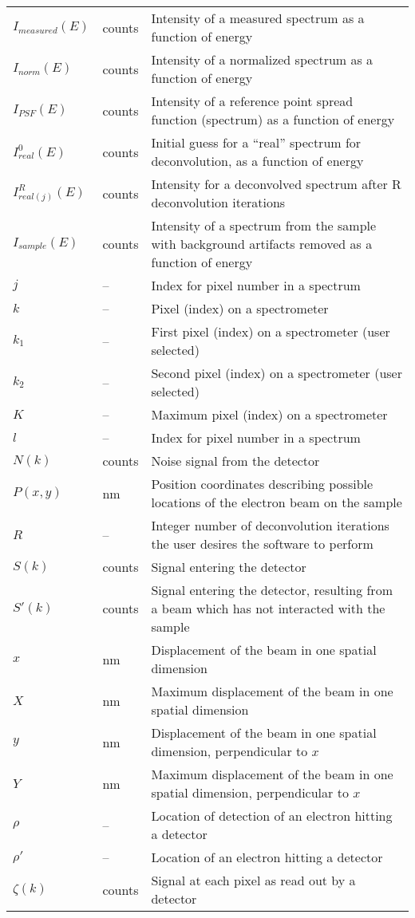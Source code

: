 \documentclass[12pt]{article}
\begin{document}
\begin{longtable*}{l l p{12cm}}
$I_{measured}(E)$ & counts & Intensity of a measured spectrum as a function of
energy\\
$I_{norm}(E)$ & counts & Intensity of a normalized spectrum as a function of
energy\\
$I_{PSF}(E)$ & counts & Intensity of a reference point spread function
(spectrum) as a function of energy\\
$I_{real}^0(E)$ & counts & Initial guess for a ``real'' spectrum for
deconvolution, as a function of energy\\
$I_{real (j)}^R(E)$ & counts & Intensity for a deconvolved spectrum after R
deconvolution iterations\\
$I_{sample}(E)$ & counts & Intensity of a spectrum from the sample with
background artifacts removed as a function of energy\\
$j$ & -- & Index for pixel number in a spectrum\\
$k$ & -- & Pixel (index) on a spectrometer\\
$k_1$ & -- & First pixel (index) on a spectrometer (user selected)\\
$k_2$ & -- & Second pixel (index) on a spectrometer (user selected)\\
$K$ & -- & Maximum pixel (index) on a spectrometer\\
$l$ & -- & Index for pixel number in a spectrum\\
$N(k)$ & counts & Noise signal from the detector\\
$P(x,y)$ & \si{\nano\metre} & Position coordinates describing possible locations
of the electron beam on the sample\\
$R$ & -- & Integer number of deconvolution iterations the user desires the
software to perform\\
$S(k)$ & counts & Signal entering the detector\\
$S'(k)$ & counts & Signal entering the detector, resulting from a beam which has
not interacted with the sample\\
$x$ & \si{\nano\metre} & Displacement of the beam in one spatial dimension\\
$X$ & \si{\nano\metre} & Maximum displacement of the beam in one spatial
dimension\\
$y$ & \si{\nano\metre} & Displacement of the beam in one spatial dimension,
perpendicular to $x$\\
$Y$ & \si{\nano\metre} & Maximum displacement of the beam in one spatial
dimension, perpendicular to $x$\\
$\rho$ & -- & Location of detection of an electron hitting a detector\\
$\rho'$ & -- & Location of an electron hitting a detector\\
$\zeta(k)$ & counts & Signal at each pixel as read out by a detector\\
\bottomrule
\end{longtable*}
\end{document}

